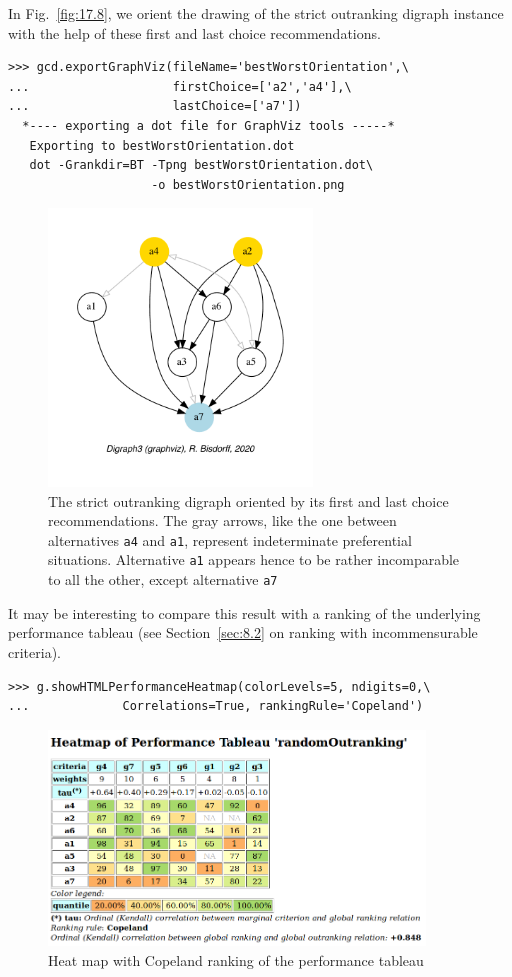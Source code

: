 In Fig.~\vref{fig:17.8}, we orient the drawing of the strict outranking digraph instance with the help of these first and last choice recommendations. 
\begin{lstlisting}
>>> gcd.exportGraphViz(fileName='bestWorstOrientation',\
...                    firstChoice=['a2','a4'],\
...                    lastChoice=['a7'])
  *---- exporting a dot file for GraphViz tools -----*
   Exporting to bestWorstOrientation.dot
   dot -Grankdir=BT -Tpng bestWorstOrientation.dot\
                    -o bestWorstOrientation.png
\end{lstlisting}
\begin{figure}[ht]
\sidecaption[t]
\includegraphics[width=7cm]{Figures/17-8-bestWorstOrientation.pdf}
\caption{The strict outranking digraph oriented by its first and last choice recommendations. The gray arrows, like the one between alternatives \texttt{a4} and \texttt{a1}, represent indeterminate preferential situations. Alternative \texttt{a1} appears hence to be rather incomparable to all the other, except alternative \texttt{a7}}
\label{fig:17.8}       %
\end{figure}

It may be interesting to compare this result with a \Copeland ranking of the underlying performance tableau (see Section~\vref{sec:8.2} on ranking with incommensurable criteria).
\begin{lstlisting}
>>> g.showHTMLPerformanceHeatmap(colorLevels=5, ndigits=0,\
...             Correlations=True, rankingRule='Copeland')
\end{lstlisting}
\begin{figure}[ht]
\includegraphics[width=10cm]{Figures/17-9-outRankingResult.png}
\caption{Heat map with Copeland ranking of the performance tableau}
\label{fig:17.9}       %
\end{figure}

